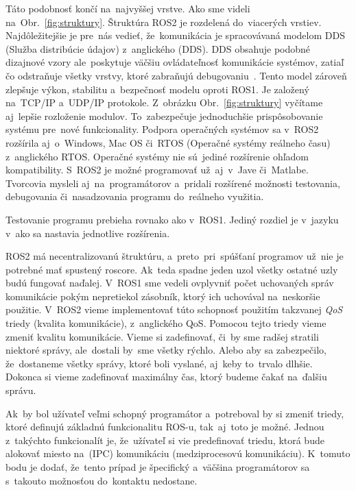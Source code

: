 Táto podobnosť končí na~najvyššej vrstve. Ako sme videli na~Obr.~\ref{fig:struktury}. Štruktúra ROS2 je rozdelená do~viacerých vrstiev.
Najdôležitejšie je pre~nás vedieť, že~komunikácia je spracovávaná modelom DDS (Služba distribúcie údajov) z~anglického
(\acrlong{DDS}). DDS obsahuje podobné dizajnové vzory ale~poskytuje väčšiu ovládateľnosť komunikácie systémov, zatiaľ
čo odstraňuje všetky vrstvy, ktoré zabraňujú debugovaniu~\cite{ElectronicDesign}. Tento model zároveň zlepšuje výkon,
stabilitu a~bezpečnosť modelu oproti ROS1. Je založený na~TCP/IP a~UDP/IP protokole. Z~obrázku Obr.~\ref{fig:struktury}
vyčítame aj~lepšie rozloženie modulov. To~zabezpečuje jednoduchšie prispôsobovanie systému pre~nové funkcionality. Podpora operačných systémov
sa v~ROS2 rozšírila aj~o~Windows, Mac OS či~RTOS (Operačné systémy reálneho času) z~anglického \acrlong{RTOS}. Operačné systémy nie sú~jediné
rozšírenie ohľadom kompatibility. S~ROS2 je možné programovať už~aj~v~Jave či~Matlabe. Tvorcovia mysleli aj~na~programátorov a~pridali rozšírené
možnosti testovania, debugovania či~nasadzovania programu do~reálneho využitia.

Testovanie programu prebieha rovnako ako v~ROS1. Jediný rozdiel je v~jazyku v~ako sa nastavia jednotlive rozšírenia.

ROS2 má necentralizovanú štruktúru, a~preto~pri~spúšťaní programov už~nie je potrebné mať spustený roscore. Ak~teda spadne jeden uzol všetky
ostatné uzly budú fungovať naďalej. V~ROS1 sme vedeli ovplyvniť počet uchovaných správ komunikácie pokým nepretiekol zásobník, ktorý ich uchovával
na~neskoršie použitie. V~ROS2 vieme implementovať túto schopnosť použitím takzvanej \textit{QoS} triedy (kvalita komunikácie), z~anglického \acrlong{QoS}.
Pomocou tejto triedy vieme zmeniť kvalitu komunikácie. Vieme si zadefinovať, či~by sme radšej stratili niektoré správy, ale~dostali by~sme
všetky rýchlo. Alebo aby sa zabezpečilo, že~dostaneme všetky správy, ktoré boli vyslané, aj~keby to~trvalo dlhšie. Dokonca si vieme zadefinovať
maximálny čas, ktorý budeme čakať na~ďalšiu správu.

Ak~by bol užívateľ veľmi schopný programátor a~potreboval by si zmeniť triedy, ktoré definujú základnú funkcionalitu ROS-u, tak~aj~toto je možné.
Jednou z~takýchto funkcionalít je, že~užívateľ si vie predefinovať triedu, ktorá bude alokovať miesto na~(IPC) komunikáciu (medziprocesovú komunikáciu).
K~tomuto bodu je dodať, že~tento prípad je špecifický a~väčšina programátorov sa s~takouto možnosťou do~kontaktu nedostane.

